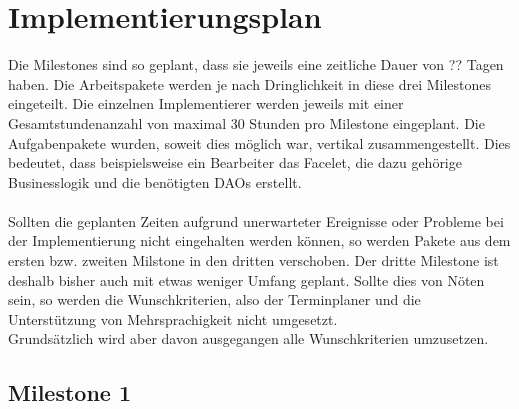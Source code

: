 \newcommand{\kursiv}[1]{{\it #1}}
\chapter{Implementierungsplan}
Die Milestones sind so geplant, dass sie jeweils eine zeitliche Dauer von ?? Tagen haben. Die Arbeitspakete werden
je nach Dringlichkeit in diese drei Milestones eingeteilt. Die einzelnen Implementierer werden jeweils
mit einer Gesamtstundenanzahl von maximal 30 Stunden pro Milestone eingeplant. Die Aufgabenpakete wurden, soweit dies möglich war, vertikal zusammengestellt.
Dies bedeutet, dass beispielsweise ein Bearbeiter das Facelet, die dazu
gehörige Businesslogik und die benötigten DAOs erstellt.\\
\ \\
Sollten die geplanten Zeiten aufgrund unerwarteter Ereignisse oder Probleme bei der Implementierung nicht eingehalten werden können, so werden Pakete aus dem
ersten bzw. zweiten Milstone in den dritten verschoben. Der dritte Milestone ist deshalb bisher auch mit etwas weniger Umfang geplant.
Sollte dies von Nöten sein, so werden die Wunschkriterien, also der Terminplaner und die Unterstützung von Mehrsprachigkeit nicht umgesetzt.\\
Grundsätzlich wird aber davon ausgegangen alle Wunschkriterien umzusetzen.
\section{Milestone 1}

